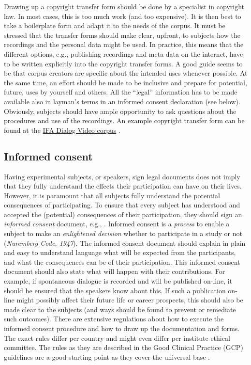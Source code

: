 \documentclass[10pt, a4paper]{article}
\begin{document}
Drawing up a copyright transfer form should be done by a specialist in copyright law. In most cases, this is too much work (and too expensive). It is then best to take a boilerplate form and adapt it to the needs of the corpus. It must be stressed that the transfer forms should make clear, upfront, to subjects how the recordings and the personal data might be used. In practice, this means that the different options, e.g., publishing recordings and meta data on the internet, have to be written explicitly into the copyright transfer forms. A good guide seems to be that corpus creators are specific about the intended uses whenever possible. At the same time, an effort should be made to be inclusive and prepare for potential, future, uses by yourself and others. All the ``legal'' information has to be made available also in layman's terms in an informed consent declaration (see below). Obviously, subjects should have ample opportunity to ask questions about the procedures and use of the recordings. An example copyright transfer form can be found at the \href{http://www.fon.hum.uva.nl/IFA-SpokenLanguageCorpora/IFADVcorpus/Documents/AkteVanRechtenoverdracht.pdf}{IFA Dialog Video corpus} \cite{IFA}.

\subsection{Informed consent}

Having experimental subjects, or speakers, sign legal documents does not imply that they fully understand the effects their participation can have on their lives. However, it is paramount that all subjects fully understand the potential consequences of participating. To ensure that every subject has understood and accepted the (potential) consequences of their participation, they should sign an \emph{informed consent} document, e.g., \cite{FQS1024}. Informed consent is a {\em process} to enable a subject to make an {\em enlightened decision} whether to participate in a study or not ({\em Nuremberg Code, 1947}). The informed consent document should explain in plain and easy to understand language what will be expected from the participants, and what the consequences can be of their participation. This informed consent document should also state what will happen with their contributions. For example, if spontaneous dialogue is recorded and will be published on-line, it should be ensured that the speakers know about this. If such a publication on-line might possibly affect their future life or career prospects, this should also be made clear to the subjects (and ways should be found to prevent or remediate such outcomes). There are extensive regulations about how to execute the informed consent procedure and how to draw up the documentation and forms. The exact rules differ per country and might even differ per institute ethical committee. The rules as they are described in the Good Clinical Practice (GCP) guidelines are a good starting point as they cover the universal base \cite{ICH1996GCP}.
\end{document}
